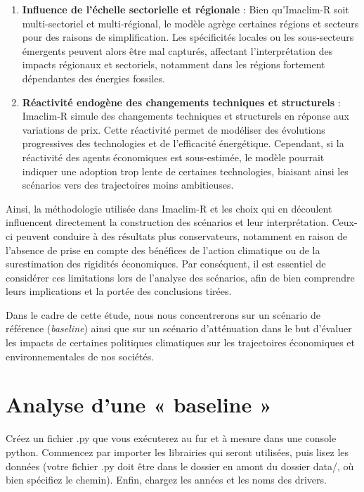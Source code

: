 \documentclass[a4,11pt]{aleph-notas}
\newcommand{\ans}[1]{
\begin{mdframed}[
    roundcorner=10pt,     %
    backgroundcolor=gray!20, %
    linecolor=black,      %
    linewidth=1pt,        %
    innertopmargin=10pt,  %
    innerbottommargin=10pt, %
    innerleftmargin=10pt,  %
    innerrightmargin=10pt  %
]
#1
\end{mdframed}
}
\begin{document}
\begin{enumerate}
    \item \textbf{Influence de l’échelle sectorielle et régionale} : Bien qu’Imaclim-R soit multi-sectoriel et multi-régional, le modèle agrège certaines régions et secteurs pour des raisons de simplification. Les spécificités locales ou les sous-secteurs émergents peuvent alors être mal capturés, affectant l’interprétation des impacts régionaux et sectoriels, notamment dans les régions fortement dépendantes des énergies fossiles.
    \item \textbf{Réactivité endogène des changements techniques et structurels} : Imaclim-R simule des changements techniques et structurels en réponse aux variations de prix. Cette réactivité permet de modéliser des évolutions progressives des technologies et de l’efficacité énergétique. Cependant, si la réactivité des agents économiques est sous-estimée, le modèle pourrait indiquer une adoption trop lente de certaines technologies, biaisant ainsi les scénarios vers des trajectoires moins ambitieuses.
\end{enumerate}

Ainsi, la méthodologie utilisée dans Imaclim-R et les choix qui en découlent influencent directement la construction des scénarios et leur interprétation. Ceux-ci peuvent conduire à des résultats plus conservateurs, notamment en raison de l'absence de prise en compte des bénéfices de l’action climatique ou de la surestimation des rigidités économiques. Par conséquent, il est essentiel de considérer ces limitations lors de l'analyse des scénarios, afin de bien comprendre leurs implications et la portée des conclusions tirées. 

Dans le cadre de cette étude, nous nous concentrerons sur un scénario de référence (\textit{baseline}) ainsi que sur un scénario d'atténuation dans le but d'évaluer les impacts de certaines politiques climatiques sur les trajectoires économiques et environnementales de nos sociétés.

\section{\Large{{Analyse d’une « baseline »}}}
\vspace{0.3cm}

\ans{Créez un fichier .py que vous exécuterez au fur et à mesure dans une console python. Commencez par importer les librairies qui seront utilisées, puis lisez les données (votre fichier .py doit être dans le dossier en amont du dossier data/, où bien spécifiez le chemin). Enfin, chargez les années et les noms des drivers.}
\end{document}
